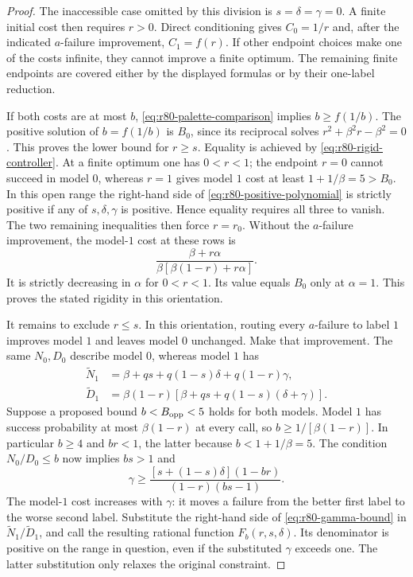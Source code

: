 \begin{proof}
The inaccessible case omitted by this division is
$s=\delta=\gamma=0$.  A finite initial cost then requires $r>0$.
Direct conditioning gives $C_0=1/r$ and, after the indicated
$a$-failure improvement, $C_1=f(r)$.  If other endpoint choices
make one of the costs infinite, they cannot improve a finite
optimum.  The remaining finite endpoints are covered either by
the displayed formulas or by their one-label reduction.

If both costs are at most $b$, \eqref{eq:r80-palette-comparison}
implies $b\ge f(1/b)$.  The positive solution of
$b=f(1/b)$ is $B_0$, since its reciprocal solves
$r^2+\beta^2r-\beta^2=0$.  This proves the lower bound for
$r\ge s$.  Equality is achieved by
\eqref{eq:r80-rigid-controller}.  At a finite optimum one has
$0<r<1$; the endpoint $r=0$ cannot succeed in model $0$, whereas
$r=1$ gives model $1$ cost at least $1+1/\beta=5>B_0$.
In this open range the right-hand side of
\eqref{eq:r80-positive-polynomial} is strictly positive if any
of $s,\delta,\gamma$ is positive.  Hence equality requires all
three to vanish.  The two remaining inequalities then force
$r=r_0$.  Without the $a$-failure improvement, the model-$1$ cost
at these rows is
\[
 \frac{\beta+r\alpha}
      {\beta[\beta(1-r)+r\alpha]}.
\]
It is strictly decreasing in $\alpha$ for $0<r<1$.
Its value equals $B_0$ only at $\alpha=1$.  This proves the
stated rigidity in this orientation.

It remains to exclude $r\le s$.  In this orientation, routing
every $a$-failure to label $1$ improves model $1$ and leaves
model $0$ unchanged.  Make that improvement.  The same $N_0,D_0$
describe model $0$, whereas model $1$ has
\begin{align*}
 \widetilde N_1&=\beta+qs+q(1-s)\delta+q(1-r)\gamma,\\
 \widetilde D_1&=\beta(1-r)
                [\beta+qs+q(1-s)(\delta+\gamma)].
\end{align*}
Suppose a proposed bound $b<B_{\rm opp}<5$ holds for both
models.  Model $1$ has success probability at most
$\beta(1-r)$ at every call, so
$b\ge1/[\beta(1-r)]$.  In particular $b\ge4$ and
$br<1$, the latter because $b<1+1/\beta=5$.
The condition $N_0/D_0\le b$ now implies $bs>1$ and
\begin{equation}\label{eq:r80-gamma-bound}
 \gamma\ge
 \frac{[s+(1-s)\delta](1-br)}{(1-r)(bs-1)}.
\end{equation}
The model-$1$ cost increases with $\gamma$: it moves a failure
from the better first label to the worse second label.  Substitute
the right-hand side of \eqref{eq:r80-gamma-bound} in
$\widetilde N_1/\widetilde D_1$, and call the resulting rational
function $F_b(r,s,\delta)$.  Its denominator is positive on the
range in question, even if the substituted $\gamma$ exceeds one.
The latter substitution only relaxes the original constraint.


\end{proof}
